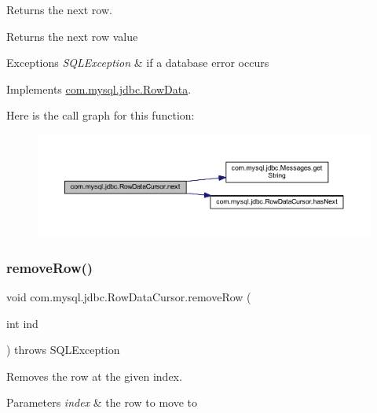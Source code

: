 Returns the next row.

\begin{DoxyReturn}{Returns}
the next row value 
\end{DoxyReturn}

\begin{DoxyExceptions}{Exceptions}
{\em S\+Q\+L\+Exception} & if a database error occurs \\
\hline
\end{DoxyExceptions}


Implements \mbox{\hyperlink{interfacecom_1_1mysql_1_1jdbc_1_1_row_data_a1984eb77a7be765f3da79a1e2349af59}{com.\+mysql.\+jdbc.\+Row\+Data}}.

Here is the call graph for this function\+:
\nopagebreak
\begin{figure}[H]
\begin{center}
\leavevmode
\includegraphics[width=350pt]{classcom_1_1mysql_1_1jdbc_1_1_row_data_cursor_a10e57b268e86eaa793ecf951ee83a863_cgraph}
\end{center}
\end{figure}
\mbox{\label{classcom_1_1mysql_1_1jdbc_1_1_row_data_cursor_a8283d0e9ac8563a11f64e5d04b0b5f59}} 
\subsubsection{\texorpdfstring{remove\+Row()}{removeRow()}}
{\footnotesize\ttfamily void com.\+mysql.\+jdbc.\+Row\+Data\+Cursor.\+remove\+Row (\begin{DoxyParamCaption}\item[{int}]{ind }\end{DoxyParamCaption}) throws S\+Q\+L\+Exception}

Removes the row at the given index.


\begin{DoxyParams}{Parameters}
{\em index} & the row to move to \\
\hline
\end{DoxyParams}

